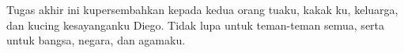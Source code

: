 \vspace{7cm}

\begin{center}
	Tugas akhir ini kupersembahkan kepada kedua orang tuaku, kakak ku, keluarga, dan kucing kesayanganku Diego. 
	Tidak lupa untuk teman-teman semua, serta untuk bangsa, negara, dan agamaku.
\end{center}

